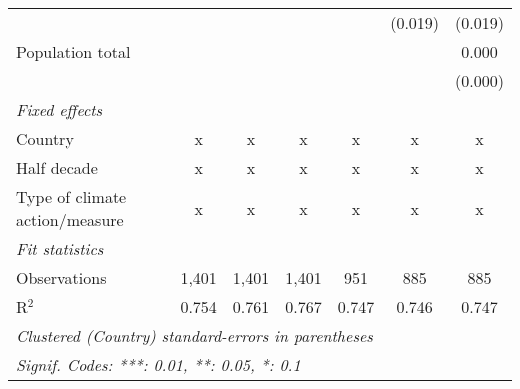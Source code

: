 \begin{tabular}{lcccccc}
                                                                                      &                &               &                &                & (0.019)        & (0.019)\\   
   Population total                                                                   &                &               &                &                &                & 0.000\\   
                                                                                      &                &               &                &                &                & (0.000)\\   
   \emph{Fixed effects}\\
   Country                                                                            & x              & x             & x              & x              & x              & x\\  
   Half decade                                                                        & x              & x             & x              & x              & x              & x\\  
   Type of climate action/measure                                                     & x              & x             & x              & x              & x              & x\\  
   \midrule \emph{Fit statistics}\\
   Observations                                                                       & 1,401          & 1,401         & 1,401          & 951            & 885            & 885\\  
   R$^2$                                                                              & 0.754          & 0.761         & 0.767          & 0.747          & 0.746          & 0.747\\  
   \midrule
   \multicolumn{7}{l}{\emph{Clustered (Country) standard-errors in parentheses}}\\
   \multicolumn{7}{l}{\emph{Signif. Codes: ***: 0.01, **: 0.05, *: 0.1}}\\
\end{tabular}
\par\endgroup


